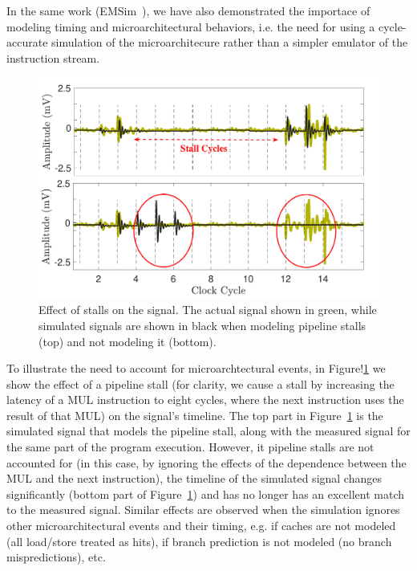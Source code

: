 In the same work (EMSim~\cite{Nader2020}), we have also demonstrated the importace of modeling timing and microarchitectural behaviors, i.e. the need for using a cycle-accurate simulation of the microarchitecure rather than a simpler emulator of the instruction stream.

\begin{figure}
	\centering
	\includegraphics[width=0.4\columnwidth,clip]{figure/stall2.pdf}
	\caption{Effect of stalls on the signal. The actual signal shown in green, while simulated signals are shown in black when modeling pipeline stalls (top) and not modeling it (bottom).}
	\label{fig:stall}
\end{figure}
To illustrate the need to account for microarchtectural events, in Figure!\ref{fig:stall} we show the effect of a pipeline stall (for clarity, we cause a stall by increasing the latency of a MUL instruction to eight cycles, where the next instruction uses the result of that MUL) on the signal's timeline. The top part in Figure~\ref{fig:stall} is the simulated signal that models the pipeline stall, along with the measured signal for the same part of the program execution. However, it pipeline stalls are not accounted for (in this case, by ignoring the effects of the dependence between the MUL and the next instruction), the timeline of the simulated signal changes significantly (bottom part of Figure~\ref{fig:stall}) and has no longer has an excellent match to the measured signal. Similar effects are observed when the simulation ignores other microarchitectural events and their timing, e.g. if caches are not modeled (all load/store treated as hits), if branch prediction is not modeled (no branch mispredictions), etc.

